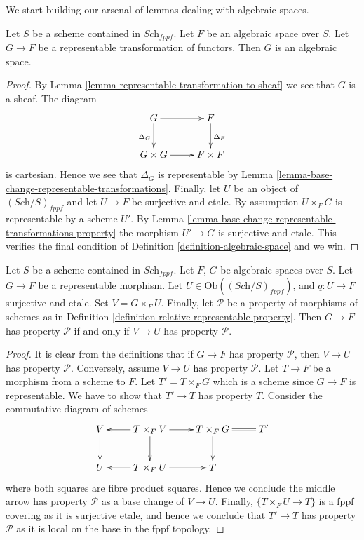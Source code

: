 \noindent
We start building our arsenal of lemmas dealing with algebraic spaces.

\begin{lemma}
\label{lemma-representable-over-space}
Let $S$ be a scheme contained in $\textit{Sch}_{fppf}$.
Let $F$ be an algebraic space over $S$.
Let $G \to F$ be a representable transformation of functors.
Then $G$ is an algebraic space.
\end{lemma}

\begin{proof}
By Lemma \ref{lemma-representable-transformation-to-sheaf}
we see that $G$ is a sheaf. The diagram
$$
\xymatrix{
G \ar[r] \ar[d]_{\Delta_G} & F \ar[d]^{\Delta_F} \\
G \times G \ar[r] & F \times F
}
$$
is cartesian. Hence we see that $\Delta_G$ is representable by
Lemma \ref{lemma-base-change-representable-transformations}.
Finally, let $U$ be an object of $(\textit{Sch}/S)_{fppf}$
and let $U \to F$ be surjective and etale. By assumption
$U \times_F G$ is representable by a scheme $U'$. By
Lemma \ref{lemma-base-change-representable-transformations-property}
the morphism $U' \to G$ is surjective and etale. This verifies
the final condition of Definition \ref{definition-algebraic-space} and we win.
\end{proof}

\begin{lemma}
\label{lemma-representable-morphisms-spaces-property}
Let $S$ be a scheme contained in $\textit{Sch}_{fppf}$.
Let $F$, $G$ be algebraic spaces over $S$.
Let $G \to F$ be a representable morphism.
Let $U \in \text{Ob}((\textit{Sch}/S)_{fppf})$, and $q : U \to F$
surjective and etale. Set $V = G \times_F U$.
Finally, let $\mathcal{P}$ be a property of morphisms
of schemes as in Definition \ref{definition-relative-representable-property}.
Then $G \to F$ has property $\mathcal{P}$ if and only if
$V \to U$ has property $\mathcal{P}$.
\end{lemma}

\begin{proof}
It is clear from the definitions that if $G \to F$ has property
$\mathcal{P}$, then $V \to U$ has property $\mathcal{P}$.
Conversely, assume $V \to U$ has property $\mathcal{P}$.
Let $T \to F$ be a morphism from a scheme to $F$.
Let $T' = T \times_F G$ which is a scheme since $G \to F$ is
representable. We have to show that $T' \to T$ has property $T$.
Consider the commutative diagram of schemes
$$
\xymatrix{
V \ar[d] & T \times_F V \ar[d] \ar[l] \ar[r] &
T \times_F G \ar[d] & \ar@{=}[l] T' \\
U & T \times_F U \ar[l] \ar[r] & T
}
$$
where both squares are fibre product squares. Hence we conclude
the middle arrow has property $\mathcal{P}$ as a base change
of $V \to U$. Finally, $\{T \times_F U \to T\}$ is a fppf covering
as it is surjective etale, and hence we conclude that
$T' \to T$ has property $\mathcal{P}$ as it is local on the
base in the fppf topology.
\end{proof}

